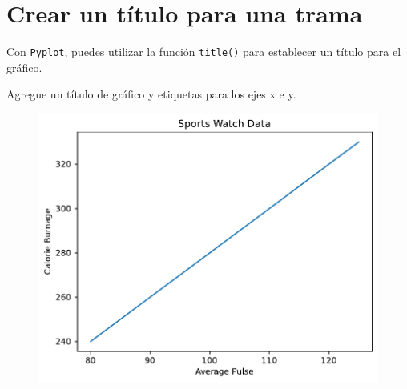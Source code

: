 \section{Crear un título para una trama}

Con \texttt{Pyplot}, puedes utilizar la función \texttt{title()} para
establecer un título para el gráfico.

\begin{code} Agregue un título de gráfico y etiquetas para los ejes x e y.

\begin{Shaded}
\begin{Highlighting}[]

\OperatorTok{=}\NormalTok{ np.array([}\NormalTok{, }\NormalTok{, }\NormalTok{, }\NormalTok{, }\NormalTok{, }\NormalTok{, }\NormalTok{, }\NormalTok{, }\NormalTok{, }\NormalTok{])}
\OperatorTok{=}\NormalTok{ np.array([}\NormalTok{, }\NormalTok{, }\NormalTok{, }\NormalTok{, }\NormalTok{, }\NormalTok{, }\NormalTok{, }\NormalTok{, }\NormalTok{, }\NormalTok{])}


\NormalTok{)}
\NormalTok{)}
\NormalTok{)}

\end{Highlighting}
\end{Shaded}

\begin{figure}
  \centering
  \includegraphics[scale=0.6]{img/grafica1024.pdf}
\end{figure}
\end{code}

